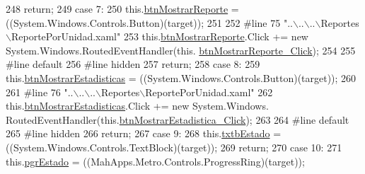 \begin{DoxyCode}
248 \textcolor{preprocessor}{}            \textcolor{keywordflow}{return};
249             \textcolor{keywordflow}{case} 7:
250             this.\hyperlink{class_proyecto___integrador__3_1_1_reportes_1_1_reporte_por_unidad_ad0b9b983d747f48216a4fb116f80a3d6}{btnMostrarReporte} = ((System.Windows.Controls.Button)(target));
251             
252 \textcolor{preprocessor}{            #line 75 "..\(\backslash\)..\(\backslash\)..\(\backslash\)Reportes\(\backslash\)ReportePorUnidad.xaml"}
253 \textcolor{preprocessor}{}            this.\hyperlink{class_proyecto___integrador__3_1_1_reportes_1_1_reporte_por_unidad_ad0b9b983d747f48216a4fb116f80a3d6}{btnMostrarReporte}.Click += \textcolor{keyword}{new} System.Windows.RoutedEventHandler(this.
      \hyperlink{class_proyecto___integrador__3_1_1_reportes_1_1_reporte_por_unidad_ae569374d459c742dcff245425c157e32}{btnMostrarReporte\_Click});
254             
255 \textcolor{preprocessor}{            #line default}
256 \textcolor{preprocessor}{}\textcolor{preprocessor}{            #line hidden}
257 \textcolor{preprocessor}{}            \textcolor{keywordflow}{return};
258             \textcolor{keywordflow}{case} 8:
259             this.\hyperlink{class_proyecto___integrador__3_1_1_reportes_1_1_reporte_por_unidad_a94105030b4216f4d35e4e26fe90de49e}{btnMostrarEstadisticas} = ((System.Windows.Controls.Button)(target));
260             
261 \textcolor{preprocessor}{            #line 76 "..\(\backslash\)..\(\backslash\)..\(\backslash\)Reportes\(\backslash\)ReportePorUnidad.xaml"}
262 \textcolor{preprocessor}{}            this.\hyperlink{class_proyecto___integrador__3_1_1_reportes_1_1_reporte_por_unidad_a94105030b4216f4d35e4e26fe90de49e}{btnMostrarEstadisticas}.Click += \textcolor{keyword}{new} System.Windows.
      RoutedEventHandler(this.\hyperlink{class_proyecto___integrador__3_1_1_reportes_1_1_reporte_por_unidad_a574153d6bf4fd1ec16f9ae0c77b70e90}{btnMostrarEstadistica\_Click});
263             
264 \textcolor{preprocessor}{            #line default}
265 \textcolor{preprocessor}{}\textcolor{preprocessor}{            #line hidden}
266 \textcolor{preprocessor}{}            \textcolor{keywordflow}{return};
267             \textcolor{keywordflow}{case} 9:
268             this.\hyperlink{class_proyecto___integrador__3_1_1_reportes_1_1_reporte_por_unidad_ab7c8420e279514d7fcf295a15f77c9d4}{txtbEstado} = ((System.Windows.Controls.TextBlock)(target));
269             \textcolor{keywordflow}{return};
270             \textcolor{keywordflow}{case} 10:
271             this.\hyperlink{class_proyecto___integrador__3_1_1_reportes_1_1_reporte_por_unidad_a1e0261a71157bdd7f6ab2c704005fc25}{pgrEstado} = ((MahApps.Metro.Controls.ProgressRing)(target));

\end{DoxyCode}
